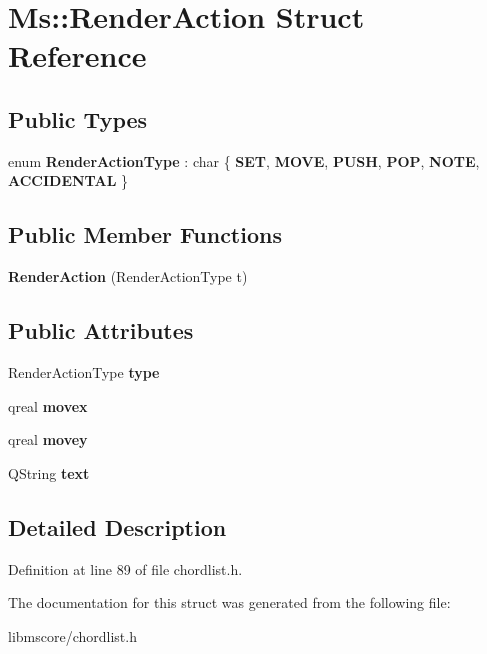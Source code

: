 \hypertarget{struct_ms_1_1_render_action}{}\section{Ms\+:\+:Render\+Action Struct Reference}
\label{struct_ms_1_1_render_action}
\subsection*{Public Types}
\begin{DoxyCompactItemize}
\item 
\mbox{\label{struct_ms_1_1_render_action_a219aaff73a9b3fcc57da3c60fa265fdc}} 
enum {\bfseries Render\+Action\+Type} \+: char \{ \newline
{\bfseries S\+ET}, 
{\bfseries M\+O\+VE}, 
{\bfseries P\+U\+SH}, 
{\bfseries P\+OP}, 
\newline
{\bfseries N\+O\+TE}, 
{\bfseries A\+C\+C\+I\+D\+E\+N\+T\+AL}
 \}
\end{DoxyCompactItemize}
\subsection*{Public Member Functions}
\begin{DoxyCompactItemize}
\item 
\mbox{\label{struct_ms_1_1_render_action_a79c69111dcd71215f6ad0436d4da2145}} 
{\bfseries Render\+Action} (Render\+Action\+Type t)
\end{DoxyCompactItemize}
\subsection*{Public Attributes}
\begin{DoxyCompactItemize}
\item 
\mbox{\label{struct_ms_1_1_render_action_a14d0af02494749a55388a78f4afffa75}} 
Render\+Action\+Type {\bfseries type}
\item 
\mbox{\label{struct_ms_1_1_render_action_ac8965a60f546bc0459c92f56bcd9b275}} 
qreal {\bfseries movex}
\item 
\mbox{\label{struct_ms_1_1_render_action_a4123b7d53137f6d594388553b4e93a59}} 
qreal {\bfseries movey}
\item 
\mbox{\label{struct_ms_1_1_render_action_ab3b0b0c3383c83aebfc5ac2b9928d37d}} 
Q\+String {\bfseries text}
\end{DoxyCompactItemize}


\subsection{Detailed Description}


Definition at line 89 of file chordlist.\+h.



The documentation for this struct was generated from the following file\+:\begin{DoxyCompactItemize}
\item 
libmscore/chordlist.\+h\end{DoxyCompactItemize}
